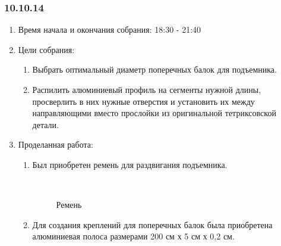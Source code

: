 
\subsubsection{10.10.14}

\begin{enumerate}
	\item Время начала и окончания собрания:
	18:30 - 21:40
	\item Цели собрания:
	\begin{enumerate}
	  \item Выбрать оптимальный диаметр поперечных балок для подъемника.
	  
	  \item Распилить алюминиевый профиль на сегменты нужной длины, просверлить в них нужные отверстия и установить их между направляющими вместо прослойки из оригинальной тетриксовской детали.
	  
    \end{enumerate}
	\item Проделанная работа:
	\begin{enumerate}
	  \item Был приобретен ремень для раздвигания подъемника.
	  
	  \begin{figure}[H]
	  	\begin{minipage}[h]{0.2\linewidth}
	  		\center  
	  	\end{minipage}
	  	\begin{minipage}[h]{0.6\linewidth}
	  		\caption{Ремень}
	  	\end{minipage}
	  \end{figure}
      
      \item  Для создания креплений для поперечных балок была приобретена алюминиевая полоса размерами 200 см х 5 см х 0,2 см.
      

\end{enumerate}
\end{enumerate}
